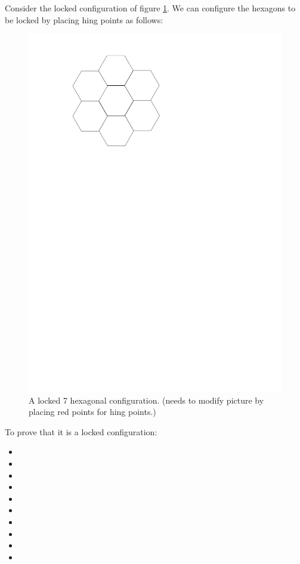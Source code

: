  Consider the locked configuration of figure \ref{figure:7hexLocked}.  We can
 configure the hexagons to be locked by placing hing points as follows:
\begin{figure}[h]
\begin{center}
\includegraphics[scale=.33]{graphics/7hexLocked.pdf}
\caption{A locked 7 hexagonal configuration.  (needs to modify picture by
placing red points for hing points.)}
\label{figure:7hexLocked}
\end{center} 
\end{figure}
To prove that it is a locked configuration:
\begin{itemize}
 \item[\rn{1}]
 \item[\rn{2}]
 \item[\rn{3}]
 \item[\rn{4}]
 \item[\rn{5}]
 \item[\rn{6}]
 \item[\rn{7}]
 \item[\rn{8}]
 \item[\rn{9}]
 \item[\rn{10}]
 \end{itemize}
